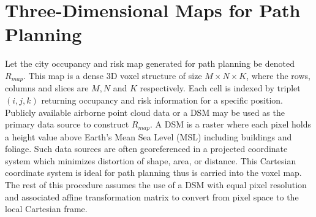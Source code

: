 


\section{Three-Dimensional Maps for Path Planning}\label{sec:ch5_cost_maps}\label{sec:ch5_occupancy_map}



Let the city occupancy and risk map generated for path planning be denoted $R_{map}$. This map is a dense 3D voxel structure of size $M\times N \times K$, where the rows, columns and slices are $M, N$ and $K$ respectively. Each cell is indexed by triplet $(i, j, k)$  returning occupancy and risk information for a specific position. Publicly available airborne point cloud data or a \ac{DSM} may be used as the primary data source to construct $R_{map}$. A \ac{DSM} is a raster where each pixel holds a height value above Earth's Mean Sea Level (MSL) including buildings and foliage. Such data sources are often georeferenced in a projected coordinate system which minimizes distortion of shape, area, or distance. This Cartesian coordinate system is ideal for path planning thus is carried into the voxel map. The rest of this procedure assumes the use of a \ac{DSM} with equal pixel resolution and associated affine transformation matrix to convert from pixel space to the local Cartesian frame.

